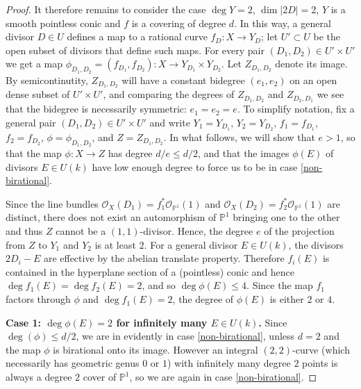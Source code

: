 \documentclass[11pt]{amsart}
\newcommand{\pp}{\mathbb{P}}
\renewcommand{\O}{\mathcal{O}}
\theoremstyle{definition}
\theoremstyle{remark}
\begin{document}
\begin{proof}
It therefore remains to consider the case $\deg Y=2$, $\dim |2D|=2$, $Y$ is a smooth pointless conic and $f$ is a covering of degree $d$. In this way, a general divisor $D \in U$ defines a map to a rational curve $f_D: X \to Y_D$; let $U' \subset U$ be the open subset of divisors that define such maps. For every pair $(D_1, D_2) \in U' \times U'$ we get a map $\phi_{D_1, D_2}=(f_{D_1}, f_{D_2}): X \to Y_{D_1}\times Y_{D_2}$. Let $Z_{D_1, D_2}$ denote its image. By semicontinutity, $Z_{D_1, D_2}$ will have a constant bidegree \((e_1,e_2)\) on an open dense subset of $U' \times U'$, and comparing the degrees of $Z_{D_1, D_2}$ and $Z_{D_2, D_1}$ we see that the bidegree is necessarily symmetric: $e_1=e_2=e$.  
To simplify notation, fix a general pair \((D_1, D_2) \in U' \times U'\) and write \(Y_1 = Y_{D_1}\), \(Y_2 = Y_{D_2}\), \(f_1 = f_{D_1}\), \(f_2 = f_{D_2}\), \(\phi = \phi_{D_1, D_2}\), and \(Z = Z_{D_1, D_2}\).
In what follows, we will show that \(e>1\), so that the map \(\phi \colon X \to Z\) has degree \(d/e \leqslant d/2\), and that the images \(\phi(E)\) of divisors \(E \in U(k)\) have low enough degree to force us to be in case \eqref{non-birational}.

    
    
    Since the line bundles \(\O_X(D_1) = f_{1}^*\O_{\pp^1}(1)\) and \(\O_X(D_2) = f_{2}^*\O_{\pp^1}(1)\) are distinct, there does not exist an automorphism of \(\pp^1\) bringing one to the other and thus \(Z\) cannot be a \((1,1)\)-divisor.  Hence, the degree \(e\) of the projection from $Z$ to $Y_{1}$ and $Y_{2}$ is at least $2$. 
    For a general divisor $E\in U(k)$, the divisors \(2D_i - E\) are effective by the abelian translate property.  Therefore $f_i(E)$ is contained in the hyperplane section of a (pointless) conic and hence $\deg f_1(E)=\deg f_2(E)=2$, and so $\deg \phi(E) \leqslant 4$.  Since the map $f_1$ factors through $\phi$ and $\deg  f_1(E) =2$, the degree of $\phi(E)$ is either $2$ or $4$.

\smallskip
    
\noindent
\textbf{\boldmath Case 1: $\deg \phi(E)=2$ for infinitely many \(E \in U(k)\).} Since \(\deg(\phi) \leqslant d/2\), we are in evidently in case \eqref{non-birational}, unless \(d=2\) and the map \(\phi\) is birational onto its image.  However an integral \((2,2)\)-curve (which necessarily has geometric genus \(0\) or \(1\)) with infinitely many degree \(2\) points is always a degree \(2\) cover of \(\pp^1\), so we are again in case \eqref{non-birational}.
    

\end{proof}
\end{document}
